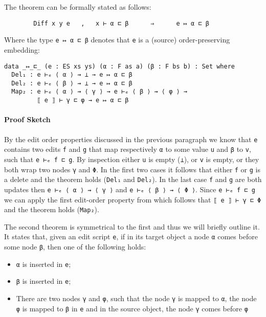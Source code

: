 \documentclass[preprint]{sigplanconf}
\begin{document}
    The theorem can be formally stated as follows:
\begin{verbatim}
        Diff x y e   ,   x ⊢ α ⊏ β      ⇒      e ↦ α ⊏ β
\end{verbatim}

    Where the type \texttt{e ↦ α ⊏ β} denotes that \texttt{e} is a (source) 
    order-preserving embedding:
\begin{verbatim}
data _↦_⊏_ (e : ES xs ys) (α : F as a) (β : F bs b) : Set where
  Del₁ : e ⊢ₑ ⟨ α ⟩ ⇝ ⊥ → e ↦ α ⊏ β
  Del₂ : e ⊢ₑ ⟨ β ⟩ ⇝ ⊥ → e ↦ α ⊏ β
  Map₂ : e ⊢ₑ ⟨ α ⟩ ⇝ ⟨ γ ⟩ → e ⊢ₑ ⟨ β ⟩ ⇝ ⟨ φ ⟩ → 
         ⟦ e ⟧ ⊢ γ ⊏ φ → e ↦ α ⊏ β
\end{verbatim}

    \paragraph{Proof Sketch} By the edit order properties discussed in the previous
    paragraph we know that \texttt{e} contains two edits \texttt{f} and \texttt{g}
    that map respectively \texttt{α} to some value \texttt{u} and \texttt{β} to
    \texttt{v}, such that \texttt{e ⊢ₑ f ⊏ g}. 
    By inspection either \texttt{u} is empty (\texttt{⊥}), or \texttt{v}
    is empty, or they both wrap two nodes \texttt{γ} and \texttt{Φ}.
    In the first two cases it follows that either \texttt{f} or \texttt{g} is
    a delete and the theorem holds (\texttt{Del₁} and \texttt{Del₂}).
    In the last case \texttt{f} and \texttt{g} are both updates then 
    \texttt{e ⊢ₑ ⟨ α ⟩ ⇝ ⟨ γ ⟩} and \texttt{e ⊢ₑ ⟨ β ⟩ ⇝ ⟨ Φ ⟩}.
    Since \texttt{e ⊢ₑ f ⊏ g} we can apply the first edit-order property from
    which follows that \texttt{⟦ e ⟧ ⊢ γ ⊏ Φ} and the theorem holds (\texttt{Map₂}).

    The second theorem is symmetrical to the first and thus we will 
    briefly outline it.
    It states that, given an edit script \texttt{e}, if in its
    target object a node \texttt{α} comes before
    some node \texttt{β}, then one of the following holds:
    \begin{itemize}
            \item \texttt{α} is inserted in \texttt{e};
            \item \texttt{β} is inserted in \texttt{e};
            \item There are two nodes \texttt{γ} and \texttt{φ}, such that the node 
            \texttt{γ} is mapped to \texttt{α}, the node \texttt{φ} is mapped to 
            \texttt{β} in 	\texttt{e} and in the source object, 
            the node \texttt{γ} comes before \texttt{φ}
    \end{itemize}
\end{document}
